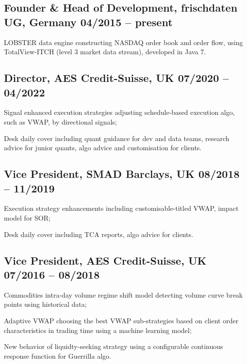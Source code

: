 \documentclass[a4paper,10pt]{article}
\begin{document}
\subsection{Founder \& Head of Development, frischdaten UG, Germany  \hfill 04/2015 -- present}
\begin{idesc}
    \item[LOBSTER data engine] constructing NASDAQ order book and order flow,  using TotalView-ITCH (level 3 market data stream), developed in Java 7.
\end{idesc}
\subsection{Director, AES Credit-Suisse, UK \hfill 07/2020 -- 04/2022}
\begin{idesc}
    \item[Signal enhanced execution strategies] adjusting schedule-based execution algo, such as VWAP, by directional signals;
    \item[Desk daily cover] including quant guidance for dev and data teams, research advice for junior quants, algo advice and customisation for clients. 
\end{idesc}
\subsection{Vice President, SMAD Barclays, UK \hfill 08/2018 -- 11/2019}
\begin{idesc}
\item[Execution strategy enhancements] including customisable-titled VWAP, impact model for SOR;
\item[Desk daily cover] including TCA reports, algo advice for clients.
\end{idesc}
\subsection{Vice President, AES Credit-Suisse, UK \hfill 07/2016 -- 08/2018}
\begin{idesc}
\item[Commodities intra-day volume regime shift model] detecting volume curve break points using historical data;   
\item[Adaptive VWAP] choosing the best VWAP sub-strategies based on client order characteristics in trading time using a machine learning model;
\item[New behavior of liquidty-seeking strategy] using a configurable continuous response function for Guerrilla algo.
\end{idesc}
\end{document}
